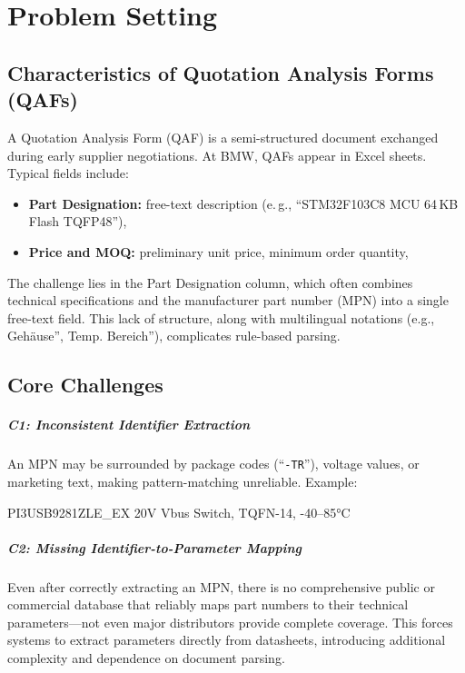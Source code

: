 \chapter{Problem Setting}
\label{chapter:problem}

\section{Characteristics of Quotation Analysis Forms (QAFs)}
A Quotation Analysis Form (QAF) is a semi-structured document exchanged during early supplier negotiations.  
At BMW, QAFs appear in Excel sheets.  
Typical fields include:  

\begin{itemize}
  \item \textbf{Part Designation:} free-text description (e.\,g., ``STM32F103C8 MCU 64\,KB Flash TQFP48''),
  \item \textbf{Price and MOQ:} preliminary unit price, minimum order quantity,
\end{itemize}

The challenge lies in the Part Designation column, which often combines technical specifications and the manufacturer part number (MPN) into a single free-text field.
This lack of structure, along with multilingual notations (e.g., Gehäuse'', Temp. Bereich''), complicates rule-based parsing.

\section{Core Challenges}
\paragraph{C1: Inconsistent Identifier Extraction}  
An MPN may be surrounded by package codes (``\texttt{-TR}''), voltage values, or marketing text, making pattern-matching unreliable.  
Example:  
\begin{center}
\ttfamily PI3USB9281ZLE\_EX   20V Vbus Switch, TQFN-14, -40–85°C
\end{center}

\paragraph{C2: Missing Identifier-to-Parameter Mapping}
Even after correctly extracting an MPN, there is no comprehensive public or commercial database that reliably maps part numbers to their technical parameters—not even major distributors provide complete coverage.
This forces systems to extract parameters directly from datasheets, introducing additional complexity and dependence on document parsing.

